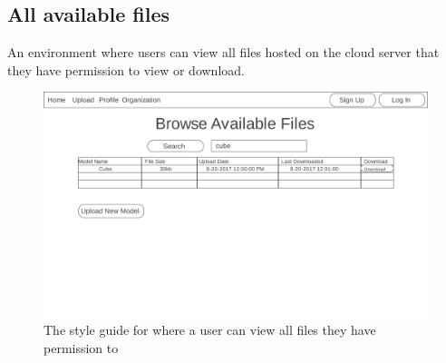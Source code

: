 \subsection{All available files}
    \hspace{7mm}
    An environment where users can view all files hosted on the cloud server that
    they have permission to view or download.
    \ \\
    \label{fig:proto_web_browse_all_files}
    \begin{figure}[H]
        \centering \includegraphics[width=0.6\linewidth]{All}
        \caption{The style guide for where a user can view all files they have permission to}
    \end{figure}
